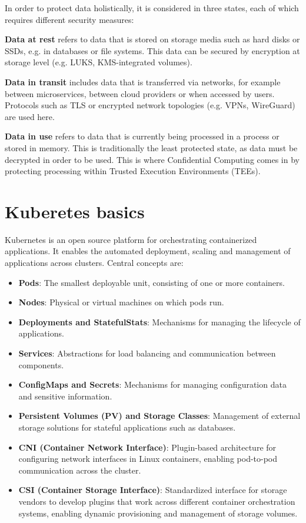 In order to protect data holistically, it is considered in three states, each of which requires different security measures:

\textbf{Data at rest} refers to data that is stored on storage media such as hard disks or SSDs, e.g. in databases or file systems. This data can be secured by encryption at storage level (e.g. LUKS, KMS-integrated volumes).

\textbf{Data in transit} includes data that is transferred via networks, for example between microservices, between cloud providers or when accessed by users. Protocols such as TLS or encrypted network topologies (e.g. VPNs, WireGuard) are used here.

\textbf{Data in use} refers to data that is currently being processed in a process or stored in memory. This is traditionally the least protected state, as data must be decrypted in order to be used. This is where Confidential Computing comes in by protecting processing within Trusted Execution Environments (TEEs).

\section{Kuberetes basics}

Kubernetes is an open source platform for orchestrating containerized applications. It enables the automated deployment, scaling and management of applications across clusters. Central concepts are:

\begin{itemize}
\item \textbf{Pods}: The smallest deployable unit, consisting of one or more containers.
\item \textbf{Nodes}: Physical or virtual machines on which pods run.
\item \textbf{Deployments and StatefulStats}: Mechanisms for managing the lifecycle of applications.
\item \textbf{Services}: Abstractions for load balancing and communication between components.
\item \textbf{ConfigMaps and Secrets}: Mechanisms for managing configuration data and sensitive information.
\item \textbf{Persistent Volumes (PV) and Storage Classes}: Management of external storage solutions for stateful applications such as databases.
\item \textbf{CNI (Container Network Interface)}: Plugin-based architecture for configuring network interfaces in Linux containers, enabling pod-to-pod communication across the cluster.
\item \textbf{CSI (Container Storage Interface)}: Standardized interface for storage vendors to develop plugins that work across different container orchestration systems, enabling dynamic provisioning and management of storage volumes.
\end{itemize}

